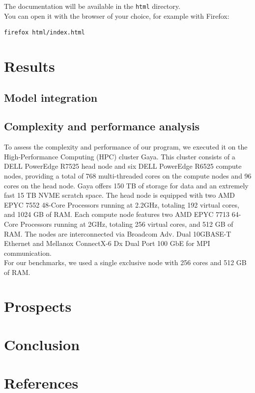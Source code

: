 \documentclass[12pt]{article}
\begin{document}
The documentation will be available in the \texttt{html} directory.\\
You can open it with the browser of your choice, for example with Firefox:

\begin{lstlisting}[language=bash]
firefox html/index.html
\end{lstlisting}

\newpage

\section{Results}
\label{sec:Results}
\subsection{Model integration}


\subsection{Complexity and performance analysis}

To assess the complexity and performance of our program, we executed it on
the High-Performance Computing (HPC) cluster Gaya. This cluster consists of a
DELL PowerEdge R7525 head node and six DELL PowerEdge R6525 compute nodes,
providing a total of 768 multi-threaded cores on the compute nodes and 96 cores
on the head node. Gaya offers 150 TB of storage for data and an extremely fast
15 TB NVME scratch space. The head node is equipped with two AMD EPYC 7552
48-Core Processors running at 2.2GHz, totaling 192 virtual cores, and 1024
GB of RAM. Each compute node features two AMD EPYC 7713 64-Core Processors
running at 2GHz, totaling 256 virtual cores, and 512 GB of RAM.
The nodes are interconnected via Broadcom Adv. Dual 10GBASE-T Ethernet and
Mellanox ConnectX-6 Dx Dual Port 100 GbE for MPI communication.\\
For our benchmarks, we used a single exclusive node with 256 cores and 512 GB
of RAM.


\section{Prospects}


\section{Conclusion}

\newpage

\section{References}


\end{document}
